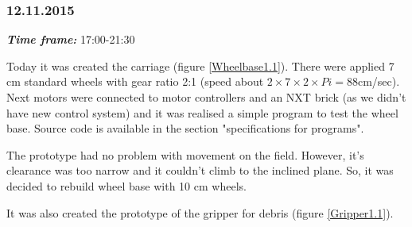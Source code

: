 \subsubsection{12.11.2015}
\textit{\textbf{Time frame:}} 17:00-21:30 

Today it was created the carriage (figure \ref{Wheelbase1.1}). There were applied 7 cm standard wheels with gear ratio 2:1 (speed about $2 \times 7 \times 2 \times Pi = 88$cm/sec). Next motors were connected to motor controllers and an NXT brick (as we didn't have new control system) and it was realised a simple program to test the wheel base. Source code is available in the section "specifications for programs".

The prototype had no problem with movement on the field. However, it's clearance was too narrow and it couldn't climb to the inclined plane. So, it was decided to rebuild wheel base with 10 cm wheels.

It was also created the prototype of the gripper for debris (figure \ref{Gripper1.1}).


